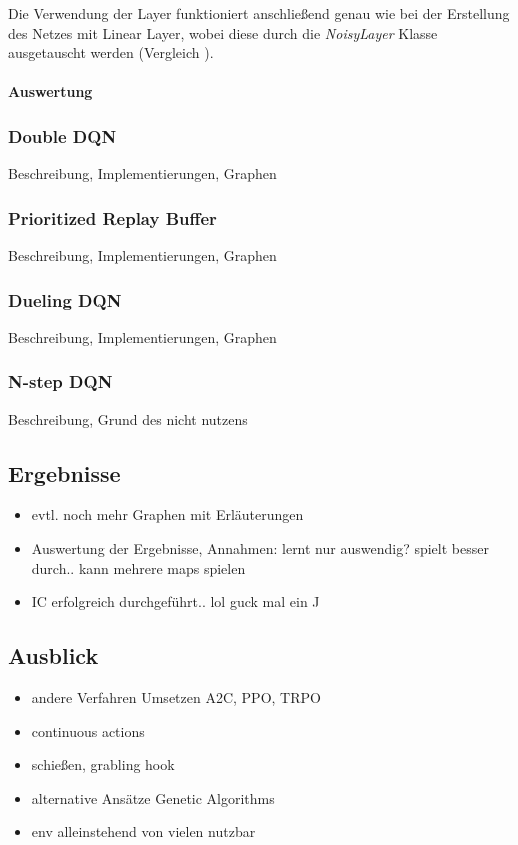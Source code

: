 \documentclass[11pt]{scrartcl}
\begin{document}
Die Verwendung der Layer funktioniert anschließend genau wie bei der Erstellung des Netzes mit
Linear Layer, wobei diese durch die \textit{NoisyLayer} Klasse ausgetauscht werden (Vergleich
). %

\paragraph*{Auswertung}
\noindent
\newline


\subsubsection{Double DQN} %
Beschreibung, Implementierungen, Graphen
\subsubsection{Prioritized Replay Buffer} %
Beschreibung, Implementierungen, Graphen
\subsubsection{Dueling DQN} %
Beschreibung, Implementierungen, Graphen
\subsubsection{N-step DQN} %
Beschreibung, Grund des nicht nutzens

\subsection{Ergebnisse} %
\begin{itemize}
\itemsep0pt	
\item evtl. noch mehr Graphen mit Erläuterungen
\item Auswertung der Ergebnisse, Annahmen: lernt nur auswendig? spielt besser durch.. kann mehrere maps spielen
\item IC erfolgreich durchgeführt.. lol guck mal ein ^^
\end{itemize}

\subsection{Ausblick} %
\begin{itemize}
\itemsep0pt	
\item andere Verfahren Umsetzen A2C, PPO, TRPO
\item continuous actions
\item schießen, grabling hook
\item alternative Ansätze Genetic Algorithms
\item env alleinstehend von vielen nutzbar
\end{itemize}
\end{document}

